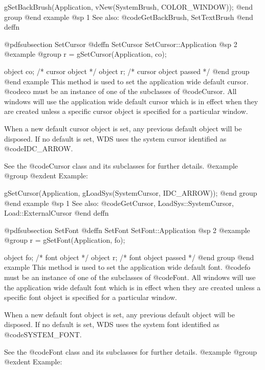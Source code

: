 gSetBackBrush(Application, vNew(SystemBrush, COLOR_WINDOW));
@end group
@end example
@sp 1
See also:  @code{GetBackBrush, SetTextBrush}
@end deffn












@pdfsubsection {SetCursor}
@deffn {SetCursor} SetCursor::Application
@sp 2
@example
@group
r = gSetCursor(Application, co);

object  co;     /*  cursor object         */
object  r;      /*  cursor object passed  */
@end group
@end example
This method is used to set the application wide default cursor.
@code{co} must be an instance of one of the subclasses of @code{Cursor}.
All windows will use the application wide default cursor which is in
effect when they are created unless a specific cursor object is
specified for a particular window.

When a new default cursor object is set, any previous default object
will be disposed.  If no default is set, WDS uses the system cursor
identified as @code{IDC_ARROW}.

See the @code{Cursor} class and its subclasses for further details.
@example
@group
@exdent Example:

gSetCursor(Application, gLoadSys(SystemCursor, IDC_ARROW));
@end group
@end example
@sp 1
See also:  @code{GetCursor, LoadSys::SystemCursor, Load::ExternalCursor}
@end deffn










@pdfsubsection {SetFont}
@deffn {SetFont} SetFont::Application
@sp 2
@example
@group
r = gSetFont(Application, fo);

object  fo;     /*  font object         */
object  r;      /*  font object passed  */
@end group
@end example
This method is used to set the application wide default font.
@code{fo} must be an instance of one of the subclasses of @code{Font}.
All windows will use the application wide default font which is in
effect when they are created unless a specific font object is
specified for a particular window.

When a new default font object is set, any previous default object
will be disposed.  If no default is set, WDS uses the system font
identified as @code{SYSTEM_FONT}.

See the @code{Font} class and its subclasses for further details.
@example
@group
@exdent Example:

